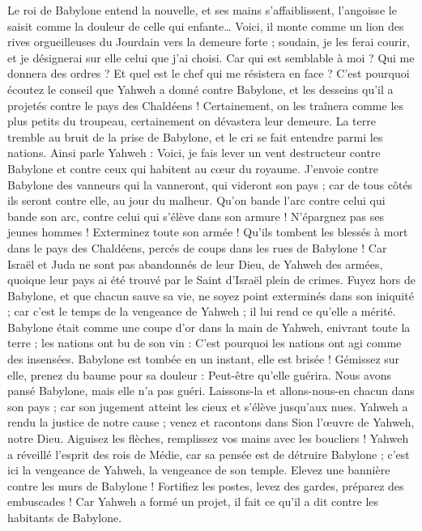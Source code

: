 \begin{multicols}{2}
Le roi de Babylone entend la nouvelle, et ses mains s'affaiblissent, l'angoisse le saisit comme la douleur de celle qui enfante…
Voici, il monte comme un lion des rives orgueilleuses du Jourdain vers la demeure forte ; soudain, je les ferai courir, et je désignerai sur elle celui que j'ai choisi. Car qui est semblable à moi ? Qui me donnera des ordres ? Et quel est le chef qui me résistera en face ?
C'est pourquoi écoutez le conseil que Yahweh a donné contre Babylone, et les desseins qu'il a projetés contre le pays des Chaldéens ! Certainement, on les traînera comme les plus petits du troupeau, certainement on dévastera leur demeure.
La terre tremble au bruit de la prise de Babylone, et le cri se fait entendre parmi les nations.
\VerseOne{}Ainsi parle Yahweh : Voici, je fais lever un vent destructeur contre Babylone et contre ceux qui habitent au cœur du royaume.
J'envoie contre Babylone des vanneurs qui la vanneront, qui videront son pays ; car de tous côtés ils seront contre elle, au jour du malheur.
Qu'on bande l'arc contre celui qui bande son arc, contre celui qui s'élève dans son armure ! N'épargnez pas ses jeunes hommes ! Exterminez toute son armée !
Qu'ils tombent les blessés à mort dans le pays des Chaldéens, percés de coups dans les rues de Babylone !
Car Israël et Juda ne sont pas abandonnés de leur Dieu, de Yahweh des armées, quoique leur pays ai été trouvé par le Saint d'Israël plein de crimes.
Fuyez hors de Babylone, et que chacun sauve sa vie, ne soyez point exterminés dans son iniquité ; car c'est le temps de la vengeance de Yahweh ; il lui rend ce qu'elle a mérité.
Babylone était comme une coupe d'or dans la main de Yahweh, enivrant toute la terre ; les nations ont bu de son vin : C'est pourquoi les nations ont agi comme des insensées.
Babylone est tombée en un instant, elle est brisée ! Gémissez sur elle, prenez du baume pour sa douleur : Peut-être qu'elle guérira.
Nous avons pansé Babylone, mais elle n'a pas guéri. Laissons-la et allons-nous-en chacun dans son pays ; car son jugement atteint les cieux et s'élève jusqu'aux nues.
Yahweh a rendu la justice de notre cause ; venez et racontons dans Sion l'œuvre de Yahweh, notre Dieu.
Aiguisez les flèches, remplissez vos mains avec les boucliers ! Yahweh a réveillé l'esprit des rois de Médie, car sa pensée est de détruire Babylone ; c'est ici la vengeance de Yahweh, la vengeance de son temple.
Elevez une bannière contre les murs de Babylone ! Fortifiez les postes, levez des gardes, préparez des embuscades ! Car Yahweh a formé un projet, il fait ce qu'il a dit contre les habitants de Babylone.

\end{multicols}
